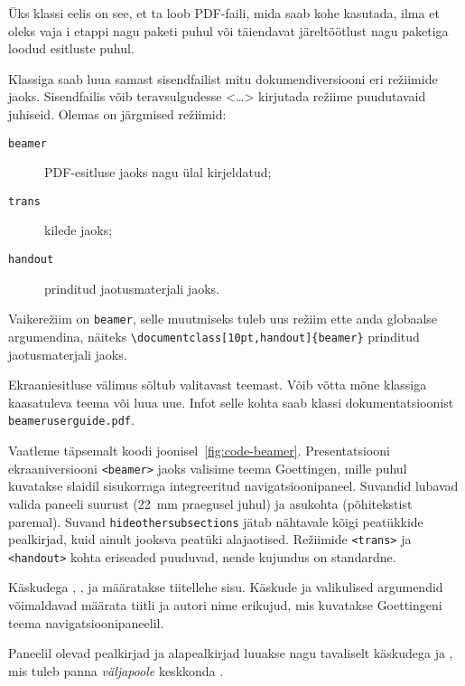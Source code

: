 Üks klassi  eelis on see, et ta loob PDF-faili, mida saab kohe
kasutada, ilma et oleks vaja \PSi i etappi nagu paketi 
puhul või täiendavat järeltöötlust nagu paketiga  loodud
esitluste puhul.

Klassiga  saab luua samast sisendfailist mitu
dokumendiversiooni eri re\v{z}iimide jaoks. Sisendfailis võib
teravsulgudesse <\ldots> kirjutada re\v{z}iime puudutavaid juhiseid.
Olemas on järgmised re\v{z}iimid:
\begin{description}
\item[\normalfont\texttt{beamer}] PDF-esitluse jaoks nagu ülal kirjeldatud;
\item[\normalfont\texttt{trans}] kilede jaoks;
\item[\normalfont\texttt{handout}] prinditud jaotusmaterjali jaoks.
\end{description}
Vaikere\v{z}iim on \texttt{beamer}, selle muutmiseks tuleb uus
re\v{z}iim ette anda globaalse argumendina, näiteks
\verb|\documentclass[10pt,handout]{beamer}| prinditud jaotusmaterjali
jaoks.

Ekraaniesitluse välimus sõltub valitavast teemast. Võib võtta mõne
klassiga  kaasatuleva teema või luua uue. Infot selle kohta
saab klassi dokumentatsioonist \texttt{beameruserguide.pdf}.

Vaatleme täpsemalt koodi joonisel~\ref{fig:code-beamer}. Presentatsiooni
ekraaniversiooni \verb|<beamer>| jaoks valisime teema
Goettingen, mille puhul kuvatakse slaidil sisukorraga integreeritud
navigatsioonipaneel. Suvandid lubavad valida paneeli suurust (22~mm
praegusel juhul) ja asukohta (põhitekstist paremal). Suvand
\texttt{hideothersubsections} jätab nähtavale kõigi peatükkide
pealkirjad, kuid ainult jooksva peatüki alajaotised. Re\v{z}iimide
\verb|<trans>| ja \verb|<handout>| kohta eriseaded
puuduvad, nende kujundus on standardne.

Käskudega , ,  ja
 määratakse tiitellehe sisu. Käskude 
ja  valikulised argumendid võimaldavad määrata tiitli ja
autori nime erikujud, mis kuvatakse Goettingeni teema
navigatsioonipaneelil.

Paneelil olevad pealkirjad ja alapealkirjad luuakse nagu tavaliselt
käskudega  ja , mis tuleb panna
\emph{väljapoole} keskkonda .

